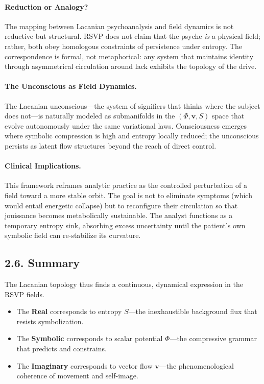 \documentclass[12pt,a4paper]{article}
\begin{document}
\paragraph{Reduction or Analogy?}
The mapping between Lacanian psychoanalysis and field dynamics is not reductive but structural.  
RSVP does not claim that the psyche \emph{is} a physical field; rather, both obey homologous constraints of persistence under entropy.  
The correspondence is formal, not metaphorical: any system that maintains identity through asymmetrical circulation around lack exhibits the topology of the drive.

\paragraph{The Unconscious as Field Dynamics.}
The Lacanian unconscious—the system of signifiers that thinks where the subject does not—is naturally modeled as submanifolds in the \((\Phi,\mathbf{v},S)\) space that evolve autonomously under the same variational laws.  
Consciousness emerges where symbolic compression is high and entropy locally reduced; the unconscious persists as latent flow structures beyond the reach of direct control.

\paragraph{Clinical Implications.}
This framework reframes analytic practice as the controlled perturbation of a field toward a more stable orbit.  
The goal is not to eliminate symptoms (which would entail energetic collapse) but to reconfigure their circulation so that jouissance becomes metabolically sustainable.  
The analyst functions as a temporary entropy sink, absorbing excess uncertainty until the patient’s own symbolic field can re-stabilize its curvature.

\subsection{2.6. Summary}

The Lacanian topology thus finds a continuous, dynamical expression in the RSVP fields.  
\begin{itemize}[leftmargin=1.2em]
\item The \textbf{Real} corresponds to entropy \(S\)—the inexhaustible background flux that resists symbolization.  
\item The \textbf{Symbolic} corresponds to scalar potential \(\Phi\)—the compressive grammar that predicts and constrains.  
\item The \textbf{Imaginary} corresponds to vector flow \(\mathbf{v}\)—the phenomenological coherence of movement and self-image.  
\end{itemize}
\end{document}
